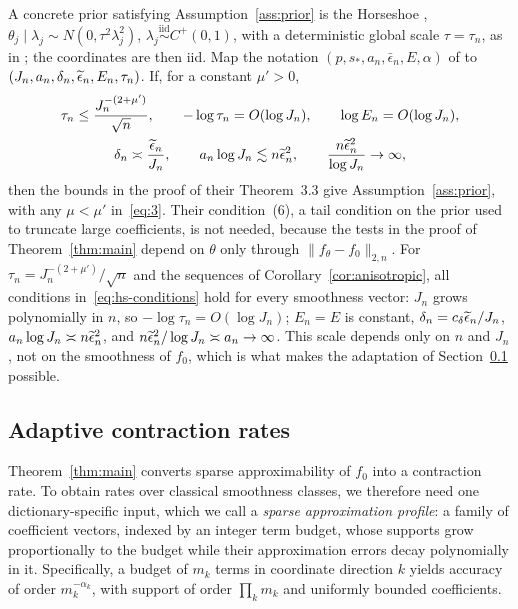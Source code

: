 A concrete prior satisfying Assumption~\ref{ass:prior} is the Horseshoe \citep{Carvalho2009,Carvalho2010}, $\theta_j\mid\lambda_j\sim N(0,\tau^2\lambda_j^2)$, $\lambda_j\overset{\mathrm{iid}}{\sim}C^+(0,1)$, with a deterministic global scale $\tau=\tau_n$, as in \citet{VanDerPas2014}; the coordinates are then iid. Map the notation $(p,s_*,a_n,\bar\epsilon_n,E,\alpha)$ of \citet{WeiGhosal2020} to $(J_n,a_n,\delta_n,\widetilde{\epsilon}_n,E_n,\tau_n)$. If, for a constant $\mu'>0$,
\begin{gather}
\tau_n\leq\frac{J_n^{-(2+\mu')}}{\sqrt n},\qquad
-\log\tau_n=O(\log J_n),\qquad
\log E_n=O(\log J_n),\notag\\
\delta_n\asymp\frac{\widetilde{\epsilon}_n}{J_n},\qquad
a_n\log J_n\lesssim n\widetilde{\epsilon}_n^2,\qquad
\frac{n\widetilde{\epsilon}_n^2}{\log J_n}\to\infty, \label{eq:hs-conditions}
\end{gather}
then the bounds in the proof of their Theorem~3.3 give Assumption~\ref{ass:prior}, with any $\mu<\mu'$ in~\eqref{eq:3}. Their condition~(6), a tail condition on the prior used to truncate large coefficients, is not needed, because the tests in the proof of Theorem~\ref{thm:main} depend on $\theta$ only through $\|f_\theta-f_0\|_{2,n}$. For $\tau_n=J_n^{-(2+\mu')}/\sqrt n$ and the sequences of Corollary~\ref{cor:anisotropic}, all conditions in~\eqref{eq:hs-conditions} hold for every smoothness vector: $J_n$ grows polynomially in $n$, so $-\log\tau_n=O(\log J_n)$; $E_n=E$ is constant, $\delta_n=c_\delta\widetilde{\epsilon}_n/J_n$, $a_n\log J_n\asymp n\widetilde{\epsilon}_n^2$, and $n\widetilde{\epsilon}_n^2/\log J_n\asymp a_n\to\infty$. This scale depends only on $n$ and $J_n$, not on the smoothness of $f_0$, which is what makes the adaptation of Section~\ref{sec:adaptive-rates} possible.

\subsection{Adaptive contraction rates}\label{sec:adaptive-rates}

Theorem~\ref{thm:main} converts sparse approximability of $f_0$ into a contraction rate. To obtain rates over classical smoothness classes, we therefore need one dictionary-specific input, which we call a \emph{sparse approximation profile}: a family of coefficient vectors, indexed by an integer term budget, whose supports grow proportionally to the budget while their approximation errors decay polynomially in it. Specifically, a budget of $m_k$ terms in coordinate direction $k$ yields accuracy of order $m_k^{-\alpha_k}$, with support of order $\prod_k m_k$ and uniformly bounded coefficients.

